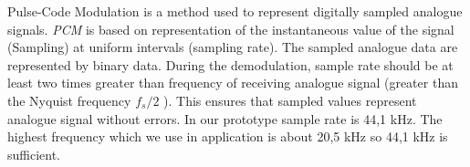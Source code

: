 \documentclass[11pt,titlepage]{article}
\theoremstyle{plain}
\begin{document}
Pulse-Code Modulation is a method used to represent digitally sampled analogue signals. \textit{PCM} is based on representation of the instantaneous value of the signal (Sampling) at uniform intervals (sampling rate). The sampled analogue data are represented by binary data. During the demodulation, sample rate should be at least two times greater than frequency of receiving analogue signal (greater than the Nyquist frequency $f_s / 2$ ). This ensures that sampled values represent analogue signal without errors. In our prototype sample rate is 44,1 kHz. The highest frequency which we use in application is about 20,5 kHz so 44,1 kHz is sufficient. 

\end{document}
